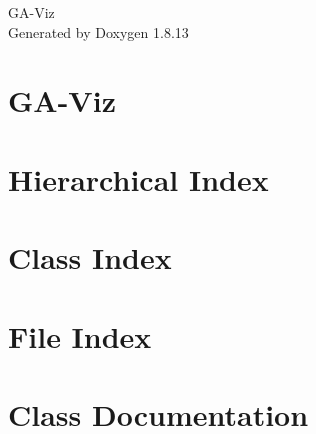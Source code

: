 \documentclass[twoside]{book}
\newcommand{\+}{\discretionary{\mbox{\scriptsize$\hookleftarrow$}}{}{}}
\newcommand{\clearemptydoublepage}{%
  \newpage{\pagestyle{empty}\cleardoublepage}%
}
\begin{document}
\hypersetup{pageanchor=false,
             bookmarksnumbered=true,
             pdfencoding=unicode
            }
\begin{titlepage}
\vspace*{7cm}
\begin{center}%
{\Large G\+A-\/\+Viz }\\
\vspace*{1cm}
{\large Generated by Doxygen 1.8.13}\\
\end{center}
\end{titlepage}
\clearemptydoublepage
{}
\tableofcontents
\clearemptydoublepage
{}
\hypersetup{pageanchor=true}

\chapter{G\+A-\/\+Viz}
\label{md__home_vicor__bureau__g_a-_viz-master__r_e_a_d_m_e}

\chapter{Hierarchical Index}

\chapter{Class Index}

\chapter{File Index}

\chapter{Class Documentation}

























\end{document}
